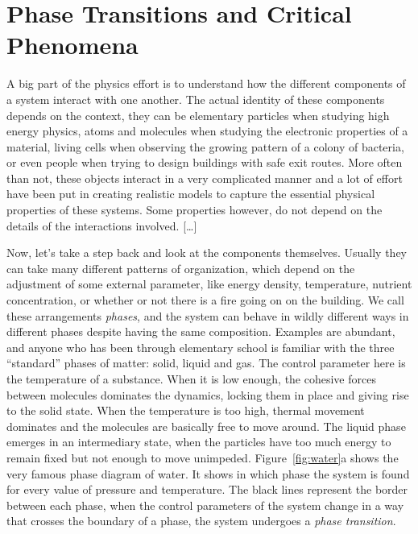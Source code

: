 \chapter{Phase Transitions and Critical Phenomena}
\label{ch2-crit}



A big part of the physics effort is to understand how the different components
of a system interact with one another. The actual identity of these components
depends on the context, they can be elementary particles when studying high
energy physics, atoms and molecules when studying the electronic properties of
a material, living cells when observing the growing pattern of a colony of
bacteria, or even people when trying to design buildings with safe exit routes.
More often than not, these objects interact in a very complicated manner and a
lot of effort have been put in creating realistic models to capture the
essential physical properties of these systems. Some properties however, do not
depend on the details of the interactions involved. [\ldots]

Now, let's take a step back and look at the components themselves.
Usually they can take many different patterns of organization, which depend on
the adjustment of some external parameter, like energy density, temperature,
nutrient concentration, or whether or not there is a fire going on on the
building. We call these arrangements \textit{phases}, and the system can behave
in wildly different ways in different phases despite having the same
composition. Examples are abundant, and anyone who has been through elementary
school is familiar with the three ``standard'' phases of matter: solid, liquid
and gas. The control parameter here is the temperature of a substance. When it
is low enough, the cohesive forces between molecules dominates the dynamics,
locking them in place and giving rise to the solid state. When the temperature
is too high, thermal movement dominates and the molecules are basically free to
move around. The liquid phase emerges in an intermediary state, when the
particles have too much energy to remain fixed but not enough to move
unimpeded. Figure~\ref{fig:water}a shows the very famous phase diagram of
water. It shows in which phase the system is found for every value of pressure
and temperature. The black lines represent the border between each phase, when
the control parameters of the system change in a way that crosses the boundary
of a phase, the system undergoes a \textit{phase transition}.

